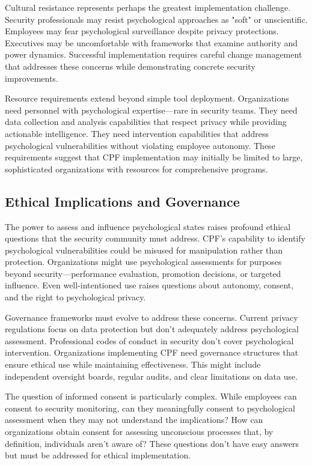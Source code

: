 \documentclass[manuscript,screen,review]{acmart}
\begin{document}
Cultural resistance represents perhaps the greatest implementation challenge. Security professionals may resist psychological approaches as "soft" or unscientific. Employees may fear psychological surveillance despite privacy protections. Executives may be uncomfortable with frameworks that examine authority and power dynamics. Successful implementation requires careful change management that addresses these concerns while demonstrating concrete security improvements.

Resource requirements extend beyond simple tool deployment. Organizations need personnel with psychological expertise—rare in security teams. They need data collection and analysis capabilities that respect privacy while providing actionable intelligence. They need intervention capabilities that address psychological vulnerabilities without violating employee autonomy. These requirements suggest that CPF implementation may initially be limited to large, sophisticated organizations with resources for comprehensive programs.

\subsection{Ethical Implications and Governance}

The power to assess and influence psychological states raises profound ethical questions that the security community must address. CPF's capability to identify psychological vulnerabilities could be misused for manipulation rather than protection. Organizations might use psychological assessments for purposes beyond security—performance evaluation, promotion decisions, or targeted influence. Even well-intentioned use raises questions about autonomy, consent, and the right to psychological privacy.

Governance frameworks must evolve to address these concerns. Current privacy regulations focus on data protection but don't adequately address psychological assessment. Professional codes of conduct in security don't cover psychological intervention. Organizations implementing CPF need governance structures that ensure ethical use while maintaining effectiveness. This might include independent oversight boards, regular audits, and clear limitations on data use.

The question of informed consent is particularly complex. While employees can consent to security monitoring, can they meaningfully consent to psychological assessment when they may not understand the implications? How can organizations obtain consent for assessing unconscious processes that, by definition, individuals aren't aware of? These questions don't have easy answers but must be addressed for ethical implementation.
\end{document}
